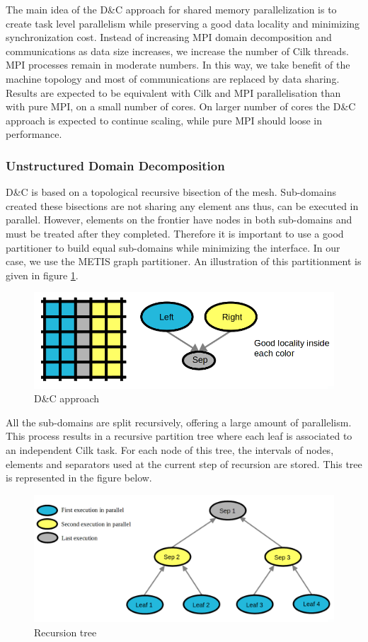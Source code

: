 \documentclass{IOS-Book-Article}
\begin{document}
The main idea of the D\&C approach for shared memory parallelization is to create task level parallelism while preserving a good data locality and minimizing synchronization cost.
Instead of increasing MPI domain decomposition and communications as data size increases, we increase the number of Cilk threads. MPI processes remain in moderate numbers.
In this way, we take benefit of the machine topology and most of communications are replaced by data sharing.
Results are expected to be equivalent with Cilk and MPI parallelisation than with pure MPI, on a small number of cores.
On larger number of cores the D\&C approach is expected to continue scaling, while pure MPI should loose in performance.

\subsubsection{Unstructured Domain Decomposition}
D\&C is based on a topological recursive bisection of the mesh. Sub-domains created these bisections are not sharing any element ans thus, can be executed in parallel.
However, elements on the frontier have nodes in both sub-domains and must be treated after they completed.
Therefore it is important to use a good partitioner to build equal sub-domains while minimizing the interface. In our case, we use the METIS graph partitioner.
An illustration of this partitionment is given in figure \ref{fig:DCapp}.
\begin{figure}[htp]
 \centering
 \includegraphics[scale=0.25]{DC_approach.png}
 \caption{D\&C approach}
 \label{fig:DCapp}
\end{figure}
 
All the sub-domains are split recursively, offering a large amount of parallelism.
This process results in a recursive partition tree where each leaf is associated to an independent Cilk task.
For each node of this tree, the intervals of nodes, elements and separators used at the current step of recursion are stored.
This tree is represented in the figure below.
\begin{figure}[htp]
 \centering
 \includegraphics[scale=0.25]{Recursion_tree.png}
 \caption{Recursion tree}
 \label{fig:RecTree}
\end{figure}
\end{document}

